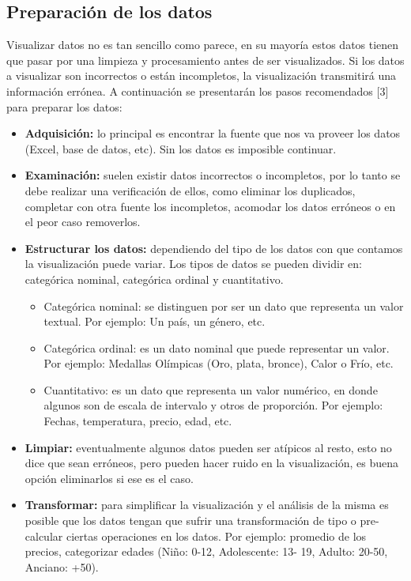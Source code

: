 \subsection{Preparación de los datos}
Visualizar datos no es tan sencillo como parece, en su mayoría estos datos tienen que pasar por una limpieza y procesamiento antes de ser visualizados. Si los datos a visualizar son incorrectos o están incompletos, la visualización transmitirá una información errónea. A continuación se presentarán los pasos recomendados [3] para preparar los datos:

\begin{itemize}
    \item\textbf{Adquisición:} lo principal es encontrar la fuente que nos va proveer los datos (Excel, base de datos, etc). Sin los datos es imposible continuar.
    \item\textbf{Examinación:} suelen existir datos incorrectos o incompletos, por lo tanto se debe realizar una verificación de ellos, como eliminar los duplicados, completar con otra fuente los incompletos, acomodar los datos erróneos o en el peor caso removerlos.
    \item\textbf{Estructurar los datos:} dependiendo del tipo de los datos con que contamos la visualización puede variar. Los tipos de datos se pueden dividir en: categórica nominal, categórica ordinal y cuantitativo.
    \begin{itemize}
        \item Categórica nominal: se distinguen por ser un dato que representa un valor textual. Por ejemplo: Un país, un género, etc.
        \item Categórica ordinal: es un dato nominal que puede representar un valor. Por ejemplo: Medallas Olímpicas (Oro, plata, bronce), Calor o Frío, etc.
        \item Cuantitativo: es un dato que representa un valor numérico, en donde algunos son de escala de intervalo y otros de proporción. Por ejemplo: Fechas, temperatura, precio, edad, etc.
    \end{itemize}
    \item\textbf{Limpiar:} eventualmente algunos datos pueden ser atípicos al resto, esto no dice que sean erróneos, pero pueden hacer ruido en la visualización, es buena opción eliminarlos si ese es el caso.
    \item\textbf{Transformar:} para simplificar la visualización y el análisis de la misma es posible que los datos tengan que sufrir una transformación de tipo o pre-calcular ciertas operaciones en los datos. Por ejemplo: promedio de los precios, categorizar edades (Niño: 0-12, Adolescente: 13- 19, Adulto: 20-50, Anciano: +50).
\end{itemize}

